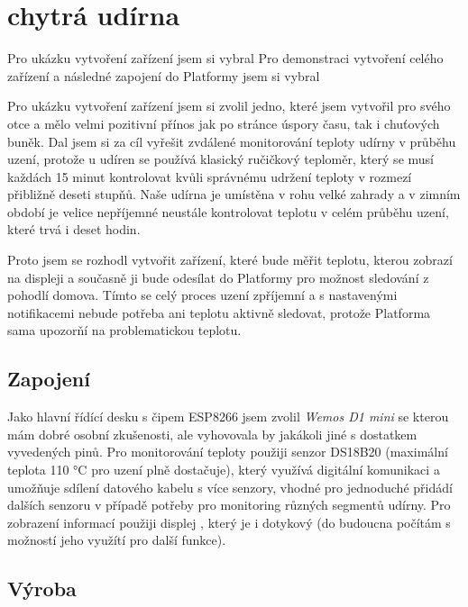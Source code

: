 \section{chytrá udírna} %
Pro ukázku vytvoření zařízení jsem si vybral
Pro demonstraci vytvoření celého zařízení a následné zapojení do Platformy jsem si vybral

Pro ukázku vytvoření zařízení jsem si zvolil jedno, které jsem vytvořil pro svého otce a mělo velmi pozitivní přínos jak po stránce úspory času, tak i chuťových buněk. Dal jsem si za cíl vyřešit zvdálené monitorování teploty udírny v průběhu uzení, protože u udíren se používá klasický ručičkový teploměr, který se musí každách 15 minut kontrolovat kvůli správnému udržení teploty v rozmezí přibližně deseti stupňů. Naše udírna je umístěna v rohu velké zahrady a v zimním období je velice nepříjemné neustále kontrolovat teplotu v celém průběhu uzení, které trvá i deset hodin.

Proto jsem se rozhodl vytvořit zařízení, které bude měřit teplotu, kterou zobrazí na displeji a současně ji bude odesílat do Platformy pro možnost sledování z pohodlí domova. Tímto se celý proces uzení zpříjemní a s nastavenými notifikacemi nebude potřeba ani teplotu aktivně sledovat, protože Platforma sama upozorňí na problematickou teplotu.

\subsection{Zapojení} %
Jako hlavní řídící desku s čipem ESP8266 jsem zvolil \textit{Wemos D1 mini} se kterou mám dobré osobní zkušenosti, ale vyhovovala by jakákoli jiné s dostatkem vyvedených pinů. Pro monitorování teploty použiji senzor DS18B20 (maximální teplota 110 °C pro uzení plně dostačuje), který využívá digitální komunikaci a umožňuje sdílení datového kabelu s více senzory, vhodné pro jednoduché přidádí dalších senzoru v případě potřeby pro monitoring různých segmentů udírny. Pro zobrazení informací použiji displej , který je i dotykový (do budoucna počítám s možností jeho využítí pro další funkce).


\subsection{Výroba} %